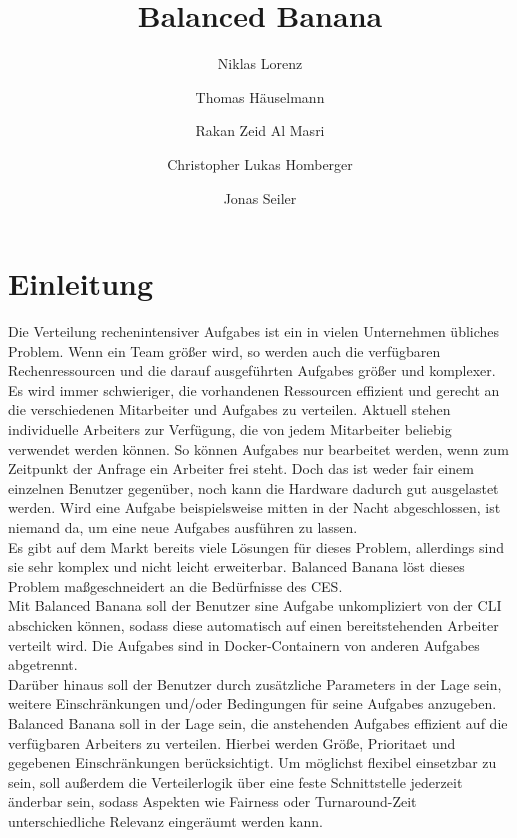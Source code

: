 \documentclass[a4paper,12pt]{article}
\title{Balanced Banana}
\author{Niklas Lorenz \and Thomas Häuselmann \and Rakan Zeid Al Masri \and Christopher Lukas Homberger \and Jonas Seiler}
\begin{document}
\setcounter{page}{2}
\tableofcontents          %
\clearpage
{}

\section{Einleitung}
\vspace*{1cm}

Die Verteilung rechenintensiver \glspl{Aufgabe} ist ein in vielen Unternehmen übliches Problem. Wenn ein Team größer wird, so werden auch die verfügbaren Rechenressourcen und die darauf ausgeführten \glspl{Aufgabe} größer und komplexer.\\


Es wird immer schwieriger, die vorhandenen Ressourcen effizient und gerecht an die verschiedenen Mitarbeiter und \glspl{Aufgabe} zu verteilen.
Aktuell stehen individuelle \glspl{Arbeiter} zur Verfügung, die von jedem Mitarbeiter beliebig verwendet werden können. So können \glspl{Aufgabe} nur bearbeitet werden, wenn zum Zeitpunkt der Anfrage ein \gls{Arbeiter} frei steht. Doch das ist weder fair einem einzelnen \gls{Benutzer} gegenüber, noch kann die Hardware dadurch gut ausgelastet werden. Wird eine \gls{Aufgabe} beispielsweise mitten in der Nacht abgeschlossen, ist niemand da, um eine neue \glspl{Aufgabe} ausführen zu lassen. \\


Es gibt auf dem Markt bereits viele Lösungen für dieses Problem, allerdings sind sie sehr komplex und nicht leicht erweiterbar.
Balanced Banana löst dieses Problem maßgeschneidert an die Bedürfnisse des CES. \\

Mit Balanced Banana soll der \gls{Benutzer} sine \gls{Aufgabe} unkompliziert von der \gls{CLI} abschicken können, sodass diese automatisch auf einen bereitstehenden \gls{Arbeiter} verteilt wird. Die \glspl{Aufgabe} sind in \gls{Docker}-Containern von anderen \glspl{Aufgabe} abgetrennt.  \\

Darüber hinaus soll der \gls{Benutzer} durch zusätzliche \glspl{Parameter} in der Lage sein, weitere Einschränkungen und/oder Bedingungen für seine \glspl{Aufgabe} anzugeben.\\

Balanced Banana soll in der Lage sein, die anstehenden \glspl{Aufgabe} effizient auf die verfügbaren \glspl{Arbeiter} zu verteilen. Hierbei werden Größe, \gls{Prioritaet} und gegebenen Einschränkungen berücksichtigt. Um möglichst flexibel einsetzbar zu sein, soll außerdem die \gls{Verteilerlogik} über eine feste \gls{Schnittstelle} jederzeit änderbar sein, sodass Aspekten wie Fairness oder \gls{Turnaround}-Zeit unterschiedliche Relevanz eingeräumt werden kann.
\end{document}
